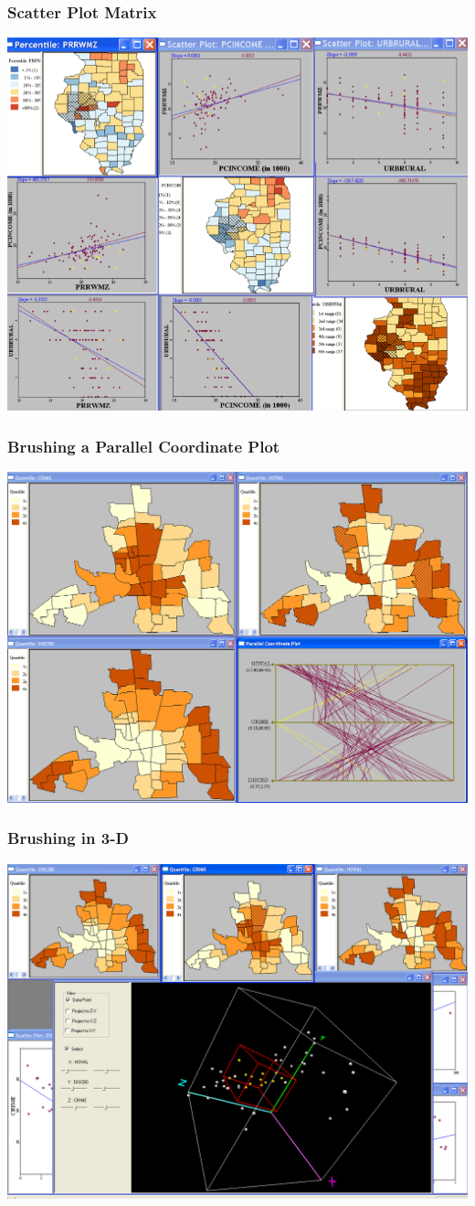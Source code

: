 \documentclass[nototal,handout]{beamer}
\begin{document}
\begin{frame}
	\frametitle{Scatter Plot Matrix}
 \begin{center}
 \includegraphics[width=.85\linewidth]{spmatrix.png}
  \end{center}
 \end{frame} 

\begin{frame}
	\frametitle{Brushing a  Parallel Coordinate Plot}
 \begin{center}
 \includegraphics[width=.85\linewidth]{brushpcpgeoda.png}
  \end{center}
 \end{frame} 

\begin{frame}
	\frametitle{Brushing in 3-D}
 \begin{center}
 \includegraphics[width=.85\linewidth]{select3d.png}
  \end{center}
 \end{frame}
\end{document}
